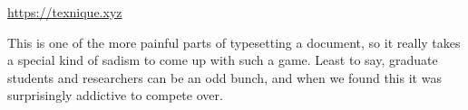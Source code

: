 		\begin{center}
		{\small \url{https://texnique.xyz}}
		\end{center}
		
		This is one of the more painful parts of typesetting a document, so it really takes a special kind of sadism to come up with such a game. Least to say, graduate students and researchers can be an odd bunch, and when we found this it was surprisingly addictive to compete over. 
		
		